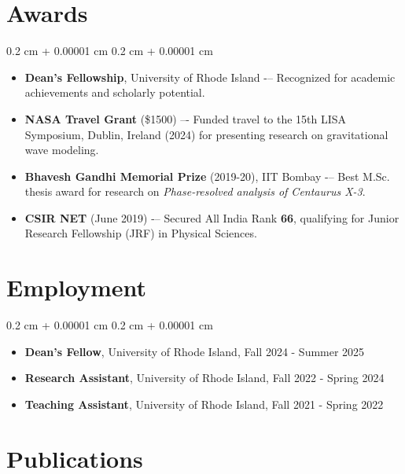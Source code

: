 \documentclass[10pt, letterpaper]{article}
\newenvironment{highlightsforbulletentries}{
    \begin{itemize}[
        topsep=0.10 cm,
        parsep=0.10 cm,
        partopsep=0pt,
        itemsep=0pt,
        leftmargin=10pt
    ]
}{
    \end{itemize}
}
\newenvironment{onecolentry}{
    \begin{adjustwidth}{
        0.2 cm + 0.00001 cm
    }{
        0.2 cm + 0.00001 cm
    }
}{
    \end{adjustwidth}
}
\begin{document}
\section{Awards} 
\begin{onecolentry}
  \begin{highlightsforbulletentries}
    \item \textbf{Dean's Fellowship}, University of Rhode Island -– Recognized for academic achievements and scholarly potential.

    \item \textbf{NASA Travel Grant} (\$1500) –- Funded travel to the 15th LISA Symposium, Dublin, Ireland (2024) for presenting research on gravitational wave modeling.

    \item \textbf{Bhavesh Gandhi Memorial Prize} (2019-20), IIT Bombay -– Best M.Sc. thesis award for research on \textit{Phase-resolved analysis of Centaurus X-3}.

    \item \textbf{CSIR NET} (June 2019) -– Secured All India Rank \textbf{66}, qualifying for Junior Research Fellowship (JRF) in Physical Sciences.
  \end{highlightsforbulletentries}
\end{onecolentry}


\section{Employment} 
\begin{onecolentry}
  \begin{highlightsforbulletentries}
    \item \textbf{Dean's Fellow}, University of Rhode Island, Fall 2024 - Summer 2025
    \item \textbf{Research Assistant}, University of Rhode Island, Fall 2022 - Spring 2024
    \item \textbf{Teaching Assistant}, University of Rhode Island, Fall 2021 - Spring 2022
  \end{highlightsforbulletentries}
\end{onecolentry}


\section{Publications}
\end{document}
